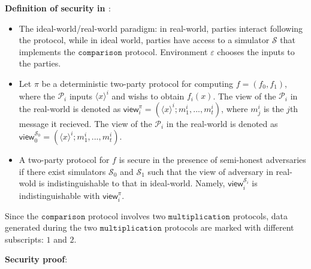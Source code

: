 \documentclass[letterpaper]{article} %
\begin{document}
    \textbf{Definition of security in \cite{SecurityProof}}:
    \begin{itemize}
        \item The ideal-world/real-world paradigm: in real-world, parties interact following the protocol,
        while in ideal world, parties have access to a
        simulator $\mathcal{S}$ that implements the $\mathtt{comparison}$ protocol.
        Environment $\varepsilon $ chooses the
        inputs to the parties.

        \item Let $\pi $ be a deterministic two-party protocol for computing
        $f=(f_{0},f_{1})$,
        where the $\mathcal{P}_{i}$ inputs $\langle x\rangle ^{i}$
        and wishs to obtain $f_{i}(x)$. The view of the $\mathcal{P}_{i}$ in the real-world
        is denoted as $\mathsf{view}_{i}^{\pi}=(\langle x\rangle ^{i};m^{i}_{1},...,m^{i}_{t})$,
        where $m^{i}_{j}$ is the $j$th message it recieved. The view of the $\mathcal{P}_{i}$ in the real-world
        is denoted as $\mathsf{view}_{0}^{\mathcal{S}_{0}}=(\langle x\rangle ^{i};m^{i}_{1},...,m^{i}_{t})$.

        \item A two-party protocol for $f$ is secure in the presence of semi-honest adversaries
        if there exist simulators $\mathcal{S}_{0}$ and $\mathcal{S}_{1}$ such that
        the view of adversary in real-wold is indistinguishable to that in ideal-world.
        Namely, $\mathsf{view}_{i}^{\mathcal{S}_{i}}$ is indistinguishable with
        $\mathsf{view}_{i}^{\pi}$.
    \end{itemize}

    Since the $\mathtt{comparison}$ protocol involves two $\mathtt{multiplication}$ protocols,
    data generated during the two $\mathtt{multiplication}$ protocols
    are marked with different subscripts: $1$ and $2$.

    \textbf{Security proof}:
\end{document}
